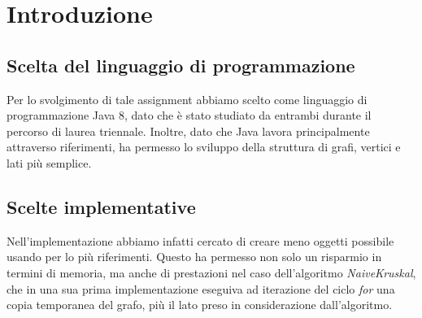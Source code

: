 \section{Introduzione}
\subsection{Scelta del linguaggio di programmazione}
Per lo svolgimento di tale assignment abbiamo scelto come linguaggio di programmazione Java 8, dato che è stato studiato da entrambi durante il percorso di laurea triennale. Inoltre, dato che Java lavora principalmente attraverso riferimenti, ha permesso lo sviluppo della struttura di grafi, vertici e lati più semplice.

\subsection{Scelte implementative}
Nell'implementazione abbiamo infatti cercato di creare meno oggetti possibile usando per lo più riferimenti. Questo ha permesso non solo un risparmio in termini di memoria, ma anche di prestazioni nel caso dell'algoritmo \textit{NaiveKruskal}, che in una sua prima implementazione eseguiva ad iterazione del ciclo \textit{for} una copia temporanea del grafo, più il lato preso in considerazione dall'algoritmo.

